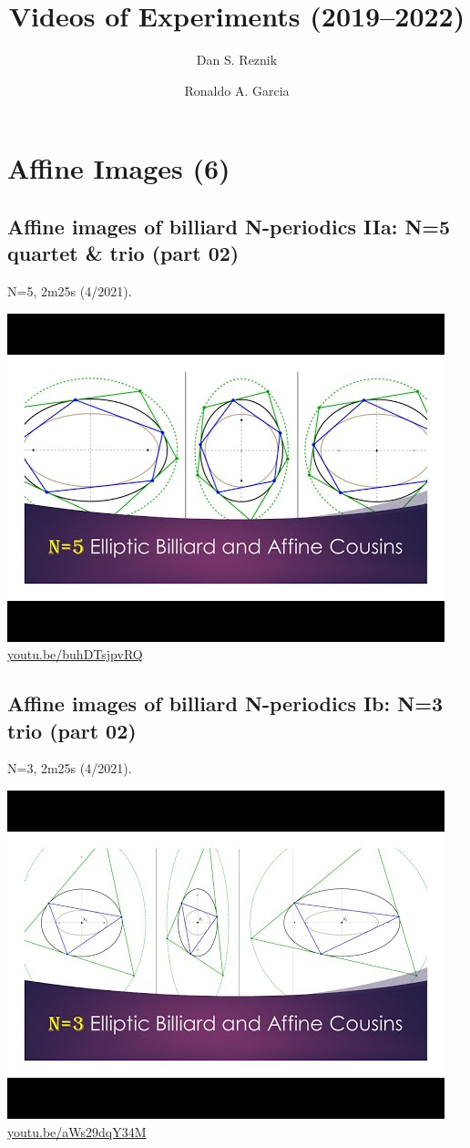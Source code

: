 \documentclass[12pt]{amsart}
\title{Videos of Experiments (2019--2022)}
\author{Dan S. Reznik}
\author{Ronaldo A. Garcia}
\begin{document}
\maketitle

\tableofcontents

\section{Affine Images (6)}

\subsection{Affine images of billiard N-periodics IIa: N=5 quartet \& trio (part 02)}
\label{vid:buhDTsjpvRQ}
\noindent N=5, 2m25s (4/2021). 
\begin{center}\includegraphics[width=.5\textwidth]{pics/buhDTsjpvRQ.jpg} \\ 
\href{https://youtu.be/buhDTsjpvRQ}{\url{youtu.be/buhDTsjpvRQ}}\end{center}
% 

\subsection{Affine images of billiard N-periodics Ib: N=3 trio (part 02)}
\label{vid:aWs29dqY34M}
\noindent N=3, 2m25s (4/2021). 
\begin{center}\includegraphics[width=.5\textwidth]{pics/aWs29dqY34M.jpg} \\ 
\href{https://youtu.be/aWs29dqY34M}{\url{youtu.be/aWs29dqY34M}}\end{center}
% 
\end{document}
